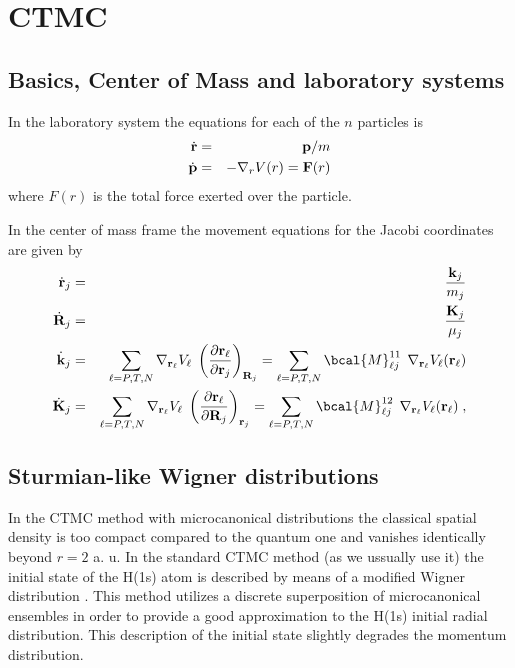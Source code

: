 \chapter{CTMC}

\section{Basics, Center of Mass and laboratory systems}

In the laboratory system the equations for each of the $n$ particles is
\begin{eqnarray*}
  \dot{\mathbf{r}} &=& \mathbf{p}/m \\
  \dot{\mathbf{p}} &=& - \nabla_{r} V(r) = \mathbf{F}(r)
\end{eqnarray*}
where $F(r)$ is the total force exerted over the particle.


In the center of mass frame the movement equations for the Jacobi
coordinates are given by
%
\begin{eqnarray} \label{Q:CTMC2}
  \dot{\vect{r}}_{j} & = &  \frac{\vect{k}_{j}}{m_{j}} \nonumber \\
  \dot{\vect{R}}_{j} & = & \frac{\vect{K}_{j}}{\mu_{j}}
  \nonumber \\
  \dot{\vect{k}}_{j} & = & \sum_{\ell = P,T,N} \nabla_{\vect{r}_{\ell}} V_{\ell} \;
  \left( \frac{\partial \vect{r}_{\ell}}{\partial \vect{r}_{j}} \right)_{\vect{R}_{j}}
  = \sum_{\ell = P,T,N} \bcal{M}^{11}_{\ell j} \;\, \nabla_{\vect{r}_{\ell}}
  V_{\ell}(\vect{r}_{\ell}) \nonumber \\
  \dot{\vect{K}}_{j} & = & \sum_{\ell = P,T,N} \nabla_{\vect{r}_{\ell}} V_{\ell} \;
  \left( \frac{\partial \vect{r}_{\ell}}{\partial \vect{R}_{j}} \right)_{\vect{r}_{j}}
  = \sum_{\ell = P,T,N} \bcal{M}^{12}_{\ell j} \;\, \nabla_{\vect{r}_{\ell}}
  V_{\ell}(\vect{r}_{\ell}) \; ,
\end{eqnarray}

\section{Sturmian-like Wigner distributions}
\label{S:sturmian-like-wigner}

In the CTMC method with microcanonical distributions the classical spatial
density is too compact compared to the quantum one and vanishes identically
beyond $r = 2$ a. u.  In the standard CTMC method (as we ussually use it) the initial
state of the H(1s) atom is described by means of a modified Wigner distribution
\parencite[see for instance][]{Hardie1983JPBp1983,Wood1997PRAp3701}. This method utilizes a discrete
superposition of microcanonical ensembles in order to provide a good
approximation to the H(1s) initial radial distribution. This description of the
initial state slightly degrades the momentum distribution.

